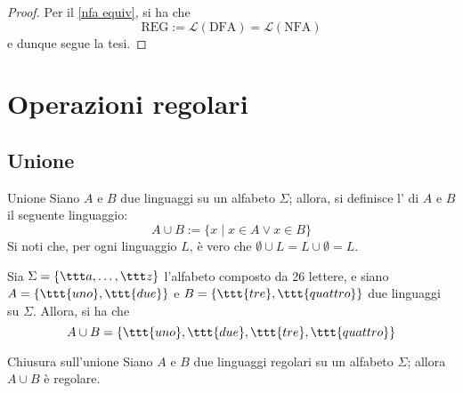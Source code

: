 \documentclass[a4paper, 12pt]{report}
\begin{document}
    \begin{proof}
        Per il \cref{nfa equiv}, si ha che $$\mathrm{REG} := \mathcal{L}(\mathrm{DFA}) = \mathcal{L}(\mathrm{NFA})$$ e dunque segue la tesi.
    \end{proof}

    \section{Operazioni regolari}

    \subsection{Unione}
    
    \begin{frameddefn}{Unione}
        Siano $A$ e $B$ due linguaggi su un alfabeto $\Sigma$; allora, si definisce l' di $A$ e $B$ il seguente linguaggio: $$A \cup B := \{x \mid x \in A \lor x \in B \}$$ Si noti che, per ogni linguaggio $L$, è vero che $\emptyset \cup L = L \cup \emptyset = L$.
    \end{frameddefn}

    \begin{example}[Unione]
        Sia $\Sigma = \{\ttt a , \ldots, \ttt z\}$ l'alfabeto composto da 26 lettere, e siano $A = \{\ttt{uno}, \ttt{due}\}$ e $B = \{\ttt{tre}, \ttt{quattro}\}$ due linguaggi su $\Sigma$. Allora, si ha che $$A \cup B = \{\ttt{uno}, \ttt{due}, \ttt{tre}, \ttt{quattro}\}$$
    \end{example}

    \begin{framedprop}[label={closure unione}]{Chiusura sull'unione}
        Siano $A$ e $B$ due linguaggi regolari su un alfabeto $\Sigma$; allora $A \cup B$ è regolare.
    \end{framedprop}
\end{document}
